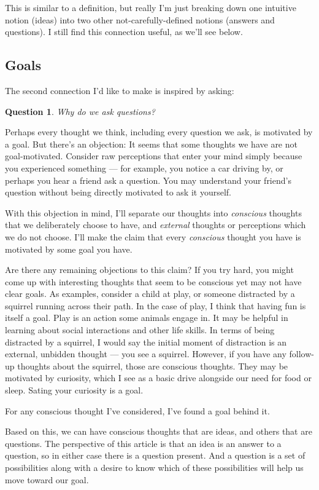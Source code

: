 \documentclass[11pt, oneside]{article}   	%
\newtheorem{question}{Question}
\begin{document}
This is similar to a definition, but really I'm just breaking down
one intuitive notion (ideas) into two other not-carefully-defined notions
(answers and questions). I still find this connection useful, as we'll see
below.

\subsection{Goals}

The second connection I'd like to make is inspired by asking:
\begin{question}
    Why do we ask questions?
\end{question}

Perhaps every thought we think, including every question we ask,
is motivated by a goal.
But there's an objection: It seems that some thoughts
we have are not goal-motivated.
Consider raw perceptions that enter your mind simply because
you experienced something --- for example, you notice a car driving by,
or perhaps you hear a friend ask a question. You may understand
your friend's question without being directly motivated to ask it yourself.

With this objection in mind, I'll separate our thoughts into
{\em conscious} thoughts that we deliberately choose to have,
and {\em external} thoughts or perceptions which we do not choose.
I'll make the claim that every {\em conscious} thought you have
is motivated by some goal you have.

Are there any remaining objections to this claim?
If you try hard, you might come up with interesting 
thoughts that seem to be conscious yet may not have
clear goals. As examples, consider a child at play, or
someone distracted by a squirrel running across their path.
In the case of play, I think that having fun is itself a goal.
Play is an action some animals engage in.
It may be helpful in learning about social interactions and
other life skills.
In terms of being distracted by a squirrel,
I would say the initial moment of distraction is an
external, unbidden thought --- you see a squirrel. However,
if you have any follow-up thoughts about the squirrel, those
are conscious thoughts. They may be motivated by
curiosity, which I see as a basic drive alongside
our need for food or sleep.
Sating your curiosity is a goal.

For any conscious thought I've considered, I've
found a goal behind it.

Based on this, we can have conscious thoughts that are ideas, and others that
are questions. The perspective of this article is that an idea is an answer to a
question, so in either case there is a question present. And a question is a set
of possibilities along with a desire to know which of these possibilities will
help us move toward our goal.
\end{document}
